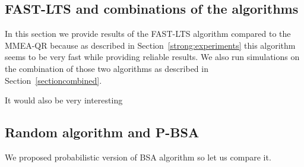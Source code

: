 \subsection{FAST-LTS and combinations of the algorithms}
In this section we provide results of the FAST-LTS algorithm compared to the MMEA-QR because as described in Section~\ref{strong:experiments} this algorithm seems to be very fast while providing reliable results. We also run simulations on the combination of those two algorithms as described in Section~\ref{sectioncombined}.


It would also be very interesting 

\subsection{Random algorithm and P-BSA}
We proposed probabilistic version of BSA algorithm so let us compare it.